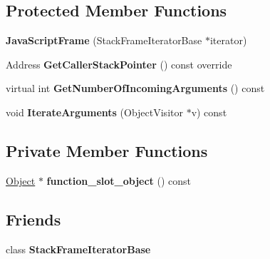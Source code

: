 \subsection*{Protected Member Functions}
\begin{DoxyCompactItemize}
\item 
{\bfseries Java\+Script\+Frame} (Stack\+Frame\+Iterator\+Base $\ast$iterator)\hypertarget{classv8_1_1internal_1_1_java_script_frame_a75cddddb27dcc0eb6db3cddd6629d531}{}\label{classv8_1_1internal_1_1_java_script_frame_a75cddddb27dcc0eb6db3cddd6629d531}

\item 
Address {\bfseries Get\+Caller\+Stack\+Pointer} () const  override\hypertarget{classv8_1_1internal_1_1_java_script_frame_a4058fbb1b88bc5335f8fc0475b6d6f4d}{}\label{classv8_1_1internal_1_1_java_script_frame_a4058fbb1b88bc5335f8fc0475b6d6f4d}

\item 
virtual int {\bfseries Get\+Number\+Of\+Incoming\+Arguments} () const \hypertarget{classv8_1_1internal_1_1_java_script_frame_af210a9b1bc5bcab62337142fa8bd2e90}{}\label{classv8_1_1internal_1_1_java_script_frame_af210a9b1bc5bcab62337142fa8bd2e90}

\item 
void {\bfseries Iterate\+Arguments} (Object\+Visitor $\ast$v) const \hypertarget{classv8_1_1internal_1_1_java_script_frame_a15101a982a09e31085e338f7e8c6352c}{}\label{classv8_1_1internal_1_1_java_script_frame_a15101a982a09e31085e338f7e8c6352c}

\end{DoxyCompactItemize}
\subsection*{Private Member Functions}
\begin{DoxyCompactItemize}
\item 
\hyperlink{classv8_1_1internal_1_1_object}{Object} $\ast$ {\bfseries function\+\_\+slot\+\_\+object} () const \hypertarget{classv8_1_1internal_1_1_java_script_frame_a089641e02512394a08bfc6675c699abf}{}\label{classv8_1_1internal_1_1_java_script_frame_a089641e02512394a08bfc6675c699abf}

\end{DoxyCompactItemize}
\subsection*{Friends}
\begin{DoxyCompactItemize}
\item 
class {\bfseries Stack\+Frame\+Iterator\+Base}\hypertarget{classv8_1_1internal_1_1_java_script_frame_ac7310421866976ca454bbe11c5f926c3}{}\label{classv8_1_1internal_1_1_java_script_frame_ac7310421866976ca454bbe11c5f926c3}

\end{DoxyCompactItemize}
